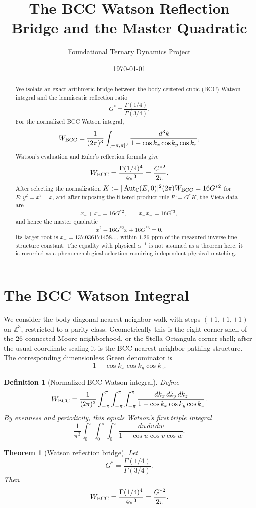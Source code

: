\documentclass[11pt,letterpaper]{article}
\title{The BCC Watson Reflection Bridge and the Master Quadratic}
\author{Foundational Ternary Dynamics Project}
\date{\today}
\newtheorem{definition}{Definition}
\newtheorem{theorem}{Theorem}
\begin{document}
\maketitle

\begin{abstract}
We isolate an exact arithmetic bridge between the body-centered cubic (BCC)
Watson integral and the lemniscatic reflection ratio
\[
G^*=\frac{\Gamma(1/4)}{\Gamma(3/4)}.
\]
For the normalized BCC Watson integral,
\[
W_{\rm BCC}=\frac{1}{(2\pi)^3}\int_{[-\pi,\pi]^3}
\frac{d^3k}{1-\cos k_x\cos k_y\cos k_z},
\]
Watson's evaluation and Euler's reflection formula give
\[
W_{\rm BCC}=\frac{\Gamma(1/4)^4}{4\pi^3}
           =\frac{G^{*2}}{2\pi}.
\]
After selecting the normalization
$K:=|\operatorname{Aut}_{\mathbb C}(E,0)|^2(2\pi)W_{\rm BCC}=16G^{*2}$
for $E:y^2=x^3-x$, and after imposing the filtered product rule
$P:=G^*K$, the Vieta data are
\[
x_++x_-=16G^{*2},\qquad x_+x_-=16G^{*3},
\]
and hence the master quadratic
\[
x^2-16G^{*2}x+16G^{*3}=0.
\]
Its larger root is $x_+=137.036171458\ldots$, within $1.26$ ppm of the
measured inverse fine-structure constant. The equality with physical
$\alpha^{-1}$ is not assumed as a theorem here; it is recorded as a
phenomenological selection requiring independent physical matching.
\end{abstract}

\section{The BCC Watson Integral}

We consider the body-diagonal nearest-neighbor walk with steps
$(\pm1,\pm1,\pm1)$ on $\mathbb Z^3$, restricted to a parity class. Geometrically
this is the eight-corner shell of the 26-connected Moore neighborhood, or the
Stella Octangula corner shell; after the usual coordinate scaling it is the BCC
nearest-neighbor pathing structure. The corresponding dimensionless Green
denominator is
\[
1-\cos k_x\cos k_y\cos k_z.
\]

\begin{definition}[Normalized BCC Watson integral]
Define
\[
W_{\rm BCC}=
\frac{1}{(2\pi)^3}\int_{-\pi}^{\pi}\int_{-\pi}^{\pi}\int_{-\pi}^{\pi}
\frac{dk_x\,dk_y\,dk_z}{1-\cos k_x\cos k_y\cos k_z}.
\]
By evenness and periodicity, this equals Watson's first triple integral
\[
\frac{1}{\pi^3}\int_0^\pi\int_0^\pi\int_0^\pi
\frac{du\,dv\,dw}{1-\cos u\cos v\cos w}.
\]
\end{definition}

\begin{theorem}[Watson reflection bridge]
Let
\[
G^*=\frac{\Gamma(1/4)}{\Gamma(3/4)}.
\]
Then
\[
W_{\rm BCC}=\frac{\Gamma(1/4)^4}{4\pi^3}
           =\frac{G^{*2}}{2\pi}.
\]
\end{theorem}
\end{document}
